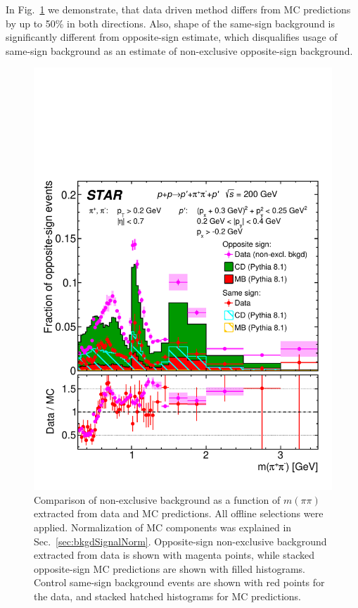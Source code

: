 In Fig.~\ref{fig:Ratio_InvMass} we demonstrate, that data driven method differs from MC predictions by up to 50\% in both directions. Also, shape of the same-sign background is significantly different from opposite-sign estimate, which disqualifies usage of same-sign background as an estimate of non-exclusive opposite-sign background.


\begin{figure}[ht!]
\centering%
\parbox{0.5725\textwidth}{%
  \centering%
  \includegraphics[width=\linewidth]{graphics/backgrounds/dataVsMc/Ratio_InvMass.pdf} 
}%
\quad%
\parbox{0.3725\textwidth}{%
    \caption[Comparison of non-exclusive background as a function of $m(\pi\pi)$ extracted from data and MC predictions.]{Comparison of non-exclusive background as a function of $m(\pi\pi)$ extracted from data and MC predictions. All offline selections were applied. Normalization of MC components was explained in Sec.~\ref{sec:bkgdSignalNorm}. Opposite-sign non-exclusive background extracted from data is shown with magenta points, while stacked opposite-sign MC predictions are shown with filled histograms. Control same-sign background events are shown with red points for the data, and stacked hatched histograms for MC predictions.}\label{fig:Ratio_InvMass} %
}
\end{figure}







